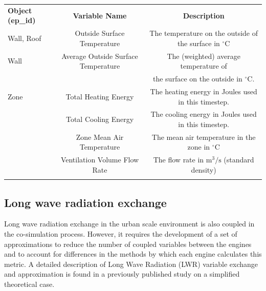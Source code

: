 \documentclass{tBPS2e}
\theoremstyle{plain}
\theoremstyle{definition}
\theoremstyle{remark}
\begin{document}
\begin{table}[H]
{\begin{tabular}[l]{@{}lcc}\toprule
  \bf{Object (ep\_id)} &  \bf{Variable Name} & \bf{Description} \\
\colrule
Wall, Roof & Outside Surface Temperature & The temperature on the outside of the surface in $^{\circ}\mathrm{C}$ \\    
    \hline
Wall & Average Outside Surface Temperature & The (weighted) average temperature of \\
& & the surface on the outside in $^{\circ}\mathrm{C}$. \\
    \hline
Zone & Total Heating Energy & The heating energy in Joules used in this timestep. \\
& Total Cooling Energy & The cooling energy in Joules used in this timestep. \\
& Zone Mean Air Temperature & The mean air temperature in the zone in $^{\circ}\mathrm{C}$ \\
& Ventilation Volume Flow Rate & The flow rate in $\mathrm{m}^3/\mathrm{s}$ (standard density) \\
\botrule
\end{tabular}}
\label{FMUexports}
\end{table}

\subsection{Long wave radiation exchange}

Long wave radiation exchange in the urban scale environment is also coupled in the co-simulation process. However, it requires the development of a set of approximations to reduce the number of coupled variables between the engines and to account for differences in the methods by which each engine calculates this metric. A detailed description of Long Wave Radiation (LWR) variable exchange and approximation is found in a previously published study \citep{Miller:2015vk} on a simplified theoretical case. 
\end{document}
